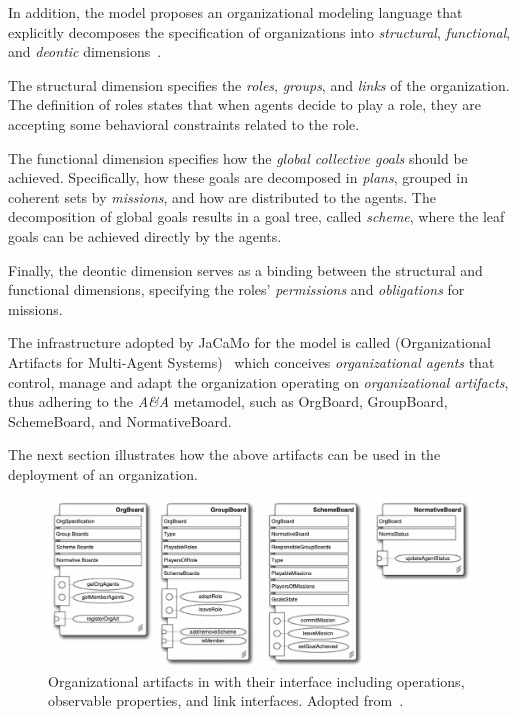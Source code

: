 In addition, the \moiseplus{} model proposes an organizational modeling language that explicitly decomposes the specification of organizations into \textit{structural}, \textit{functional}, and \textit{deontic} dimensions~\cite{doi:10.1504/IJAOSE.2007.016266}\cite{10.1145/544741.544858}.

The structural dimension specifies the \textit{roles}, \textit{groups}, and \textit{links} of the organization.
The definition of roles states that when agents decide to play a role, they are accepting some behavioral constraints related to the role.

The functional dimension specifies how the \textit{global collective goals} should be achieved.
Specifically, how these goals are decomposed in \textit{plans}, grouped in coherent sets by \textit{missions}, and how are distributed to the agents.
The decomposition of global goals results in a goal tree, called \textit{scheme}, where the leaf goals can be achieved directly by the agents.

Finally, the deontic dimension serves as a binding between the structural and functional dimensions, specifying the roles' \textit{permissions} and \textit{obligations} for missions.

The infrastructure adopted by JaCaMo for the \moiseplus{} model is called \oraformas{} (Organizational Artifacts for Multi-Agent Systems)~\cite{hubner2010} which conceives \textit{organizational agents} that control, manage and adapt the organization operating on \textit{organizational artifacts}, thus adhering to the \textit{A\&A} metamodel, such as \textsf{OrgBoard}, \textsf{GroupBoard}, \textsf{SchemeBoard}, and \textsf{NormativeBoard}.

The next section illustrates how the above artifacts can be used in the deployment of an organization.

\begin{figure}[H]
    \centering
    \includegraphics[width=\linewidth]{images/org-artifacts.png}
    \caption{Organizational artifacts in \oraformas{} with their interface including operations, observable properties, and link interfaces. Adopted from~\cite{hubner2010}.}
    \label{fig:org-artifacts}
\end{figure}

